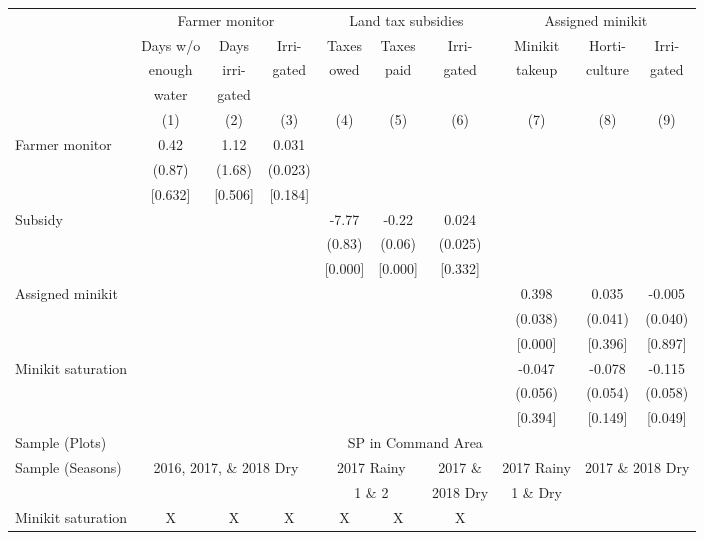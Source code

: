 \begin{tabular}{lccccccccc}
\hline \hline
 & \multicolumn{3}{c}{Farmer monitor} & \multicolumn{3}{c}{Land tax subsidies} & \multicolumn{3}{c}{Assigned minikit} \\
\cmidrule(lr){2-4}\cmidrule(lr){5-7}\cmidrule(lr){8-10}
 & Days w/o & Days & Irri- & Taxes & Taxes & Irri- & Minikit & Horti- & Irri- \\
 & enough & irri- & gated & owed & paid & gated & takeup & culture & gated \\
 & water & gated & & & & & & & \\
\cmidrule(lr){2-2}\cmidrule(lr){3-3}\cmidrule(lr){4-4}\cmidrule(lr){5-5}\cmidrule(lr){6-6}\cmidrule(lr){7-7}\cmidrule(lr){8-8}\cmidrule(lr){9-9}\cmidrule(lr){10-10}
 & (1) & (2) & (3) & (4) & (5) & (6) & (7) & (8) & (9) \\
\hline
Farmer monitor & 0.42 & 1.12 & 0.031 &  &  &  &  &  &  \\
 & (0.87) & (1.68) & (0.023) &  &  &  &  &  &  \\
 & [0.632] & [0.506] & [0.184] &  &  &  &  &  &  \\
Subsidy &  &  &  & -7.77\hphantom{-} & -0.22\hphantom{-} & 0.024 &  &  &  \\
 &  &  &  & (0.83) & (0.06) & (0.025) &  &  &  \\
 &  &  &  & [0.000] & [0.000] & [0.332] &  &  &  \\
Assigned minikit &  &  &  &  &  &  & 0.398 & 0.035 & -0.005\hphantom{-} \\
 &  &  &  &  &  &  & (0.038) & (0.041) & (0.040) \\
 &  &  &  &  &  &  & [0.000] & [0.396] & [0.897] \\
Minikit saturation &  &  &  &  &  &  & -0.047\hphantom{-} & -0.078\hphantom{-} & -0.115\hphantom{-} \\
 &  &  &  &  &  &  & (0.056) & (0.054) & (0.058) \\
 &  &  &  &  &  &  & [0.394] & [0.149] & [0.049] \\
\hline
Sample (Plots) & \multicolumn{9}{c}{SP in Command Area} \\
Sample (Seasons) & \multicolumn{3}{c}{2016, 2017, \& 2018 Dry} & \multicolumn{2}{c}{2017 Rainy} & 2017 \& & 2017 Rainy & \multicolumn{2}{c}{2017 \& 2018 Dry} \\
 & \multicolumn{3}{c}{} & \multicolumn{2}{c}{1 \& 2} &  2018 Dry & 1 \& Dry & \multicolumn{2}{c}{} \\
\hline
Minikit saturation & X & X & X & X & X & X &  &  &  \\

\end{tabular}
